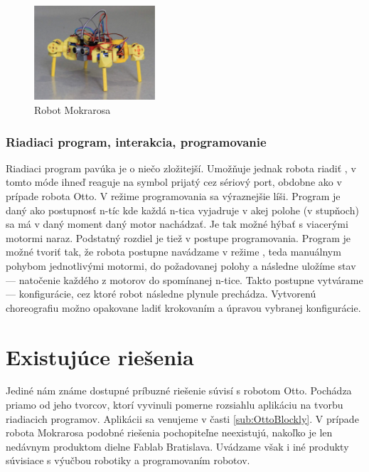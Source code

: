 \begin{figure}
\centerline{\includegraphics[width=0.4\textwidth]{images/mokrarosa}}
\caption[Robot Mokrarosa]{Robot Mokrarosa}
\label{obr:mokrarosa}
\end{figure}

\subsubsection{Riadiaci program, interakcia, programovanie}
Riadiaci program pavúka je o niečo zložitejší. Umožňuje jednak robota riadiť , v tomto móde ihneď reaguje na symbol prijatý cez sériový port, obdobne ako v prípade robota Otto. V režime programovania sa výraznejšie líši. Program je daný ako postupnosť n-tíc kde každá n-tica vyjadruje v akej polohe (v stupňoch) sa má v daný moment daný motor nachádzať. Je tak možné hýbať s viacerými motormi naraz. Podstatný rozdiel je tiež v postupe programovania. Program je možné tvoriť tak, že robota postupne navádzame v režime , teda manuálnym pohybom jednotlivými motormi, do požadovanej polohy a následne uložíme stav --- natočenie každého z motorov do spomínanej n-tice. Takto postupne vytvárame  --- konfigurácie, cez ktoré robot následne plynule prechádza. Vytvorenú choreografiu možno opakovane ladiť krokovaním a úpravou vybranej konfigurácie.

\section{Existujúce riešenia}
Jediné nám známe dostupné príbuzné riešenie súvisí s robotom Otto. Pochádza priamo od jeho tvorcov, ktorí vyvinuli pomerne rozsiahlu aplikáciu na tvorbu  riadiacich programov. Aplikácii sa venujeme v časti \ref{sub:OttoBlockly}. V prípade robota Mokrarosa podobné riešenia pochopiteľne neexistujú, nakoľko je len nedávnym produktom dielne Fablab Bratislava. Uvádzame však i iné produkty súvisiace s výučbou robotiky a programovaním robotov.

